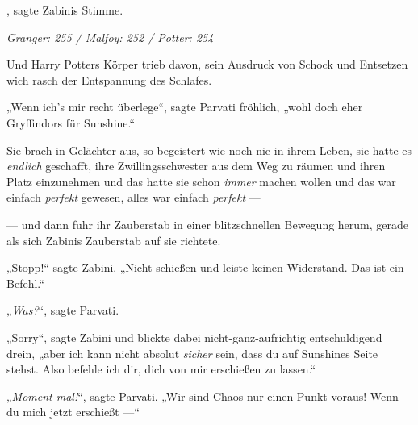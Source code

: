 , sagte Zabinis Stimme.

\later

\emph{Granger: 255 / Malfoy: 252 / Potter: 254}

Und Harry Potters Körper trieb davon, sein Ausdruck von Schock und Entsetzen wich rasch der Entspannung des Schlafes.

„Wenn ich’s mir recht überlege“, sagte Parvati fröhlich, „wohl doch eher Gryffindors für Sunshine.“

Sie brach in Gelächter aus, so begeistert wie noch nie in ihrem Leben, sie hatte es \emph{endlich} geschafft, ihre Zwillingsschwester aus dem Weg zu räumen und ihren Platz einzunehmen und das hatte sie schon \emph{immer} machen wollen und das war einfach \emph{perfekt} gewesen, alles war einfach \emph{perfekt} —

— und dann fuhr ihr Zauberstab in einer blitzschnellen Bewegung herum, gerade als sich Zabinis Zauberstab auf sie richtete.

„Stopp!“ sagte Zabini.
„Nicht schießen und leiste keinen Widerstand. Das ist ein Befehl.“

„\emph{Was?}“, sagte Parvati.

„Sorry“, sagte Zabini und blickte dabei nicht-ganz-aufrichtig entschuldigend drein, „aber ich kann nicht absolut \emph{sicher} sein, dass du auf Sunshines Seite stehst. Also befehle ich dir, dich von mir erschießen zu lassen.“

„\emph{Moment mal!}“, sagte Parvati.
„Wir sind Chaos nur einen Punkt voraus! Wenn du mich jetzt erschießt —“

